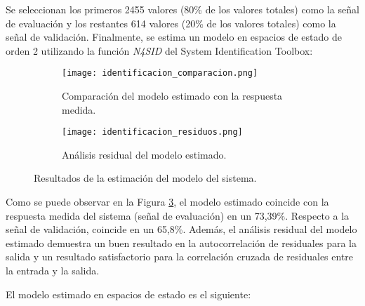 Se seleccionan los primeros 2455 valores (80\% de los valores totales) como la señal de evaluación
y los restantes 614 valores (20\% de los valores totales) como la señal de validación. Finalmente,
se estima un modelo en espacios de estado de orden 2 utilizando la función \textit{N4SID} del System Identification Toolbox:

\begin{figure}[H]
    \centering

    \begin{subfigure}[b]{\textwidth}
        \centering
        \texttt{[image: identificacion\_comparacion.png]}
        \caption{Comparación del modelo estimado con la respuesta medida.}
        \vspace{0.25cm}
        \label{fig:identificacion_comparacio n}
    \end{subfigure}
    \begin{subfigure}[b]{\textwidth}
        \centering
        \texttt{[image: identificacion\_residuos.png]}
        \caption{Análisis residual del modelo estimado.}
        \label{fig:identificacion_residuos}
    \end{subfigure}

    \vspace{-0.25cm}
    \caption{Resultados de la estimación del modelo del sistema.}
    \label{fig:identificacion_resultados}
\end{figure}
\vspace{-0.5cm}

Como se puede observar en la Figura \ref{fig:identificacion_resultados}, el modelo estimado coincide
con la respuesta medida del sistema (señal de evaluación) en un 73,39\%. Respecto a la señal de 
validación, coincide en un 65,8\%. Además, el análisis residual del modelo estimado
demuestra un buen resultado en la autocorrelación de residuales para la salida y un resultado
satisfactorio para la correlación cruzada de residuales entre la entrada y la salida.

El modelo estimado en espacios de estado es el siguiente:

